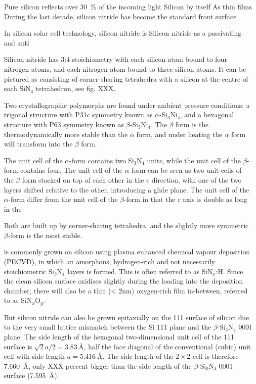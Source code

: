 \documentclass[11pt,bibliography=totoc,index=totoc]{scrbook}   %
\begin{document}
Pure silicon reflects over 30~\% of the incoming light
Silicon by itself 
As thin films 
During the last decade, silicon nitride has become the standard front surface

In silicon solar cell technology, silicon nitride is 
Silicon nitride as a passivating and anti

Silicon nitride has 3:4 stoichiometry with each silicon atom bound to four nitrogen atoms,
and each nitrogen atom bound to three silicon atoms. It can be pictured as consisting of 
corner-sharing tetrahedra with a silicon at the centre of each SiN$_4$ tetrahedron, see fig. XXX.

\cite{Riley:2000}

Two crystallographic polymorphs are found under ambient pressure conditions:
a trigonal structure with P31c symmetry known as $\alpha$-Si$_3$Ni$_4$, and a hexagonal structure with P63 symmetry
known as $\beta$-Si$_3$Ni$_4$.
The $\beta$ form is the thermodynamically more stable than the $\alpha$ form, and under heating the $\alpha$ form will transform into the $\beta$ form.
\cite{Riley:2000}

\cite{Morita:1999}

The unit cell of the $\alpha$-form contains two Si$_3$N$_4$ units, while the unit cell of the $\beta$-form contains four.
The unit cell of the $\alpha$-form can be seen as two unit cells of the $\beta$ form stacked on top of each other in the $c$ direction, with one of the two layers shifted relative to the other, introducing a glide plane.
The unit cell of the $\alpha$-form differ from the unit cell of the $\beta$-form in that the $c$ axis is double as long in the 

Both are built up by corner-sharing tetrahedra, and the slightly more symmetric $\beta$-form is the most stable.

is commonly grown on silicon using plasma enhanced chemical vapour deposition (PECVD), 
in which an amorphous, hydrogen-rich and not necessarily stoichiometric Si$_3$N$_4$ layers is formed. 
This is often referred to as SiN$_x$:H. Since the clean silicon surface oxidises slightly during the loading into the 
deposition chamber, there will also be a thin (< 2nm) oxygen-rich film in-between, referred to as SiN$_x$O$_y$.
\cite{Aberle:2001}

But silicon nitride can also be grown epitaxially on the 111 surface of silicon due to the very small lattice mismatch
between the Si 111 plane and the $\beta$-Si$_3$N$_4$ 0001 plane.
The side length of the hexagonal two-dimensional unit cell of the 111 surface is $\sqrt{2}a/2=\SI{3.83}{\angstrom}$, half the face diagonal of the conventional (cubic) unit cell with side length $a=\SI{5.416}{\angstrom}$. The side length of the $2\times 2$ cell is therefore \SI{7.660}{\angstrom}, only XXX percent bigger than the side length of the $\beta$-Si$_3$N$_4$ 0001 surface (\SI{7.595}{\angstrom}).
\end{document}
